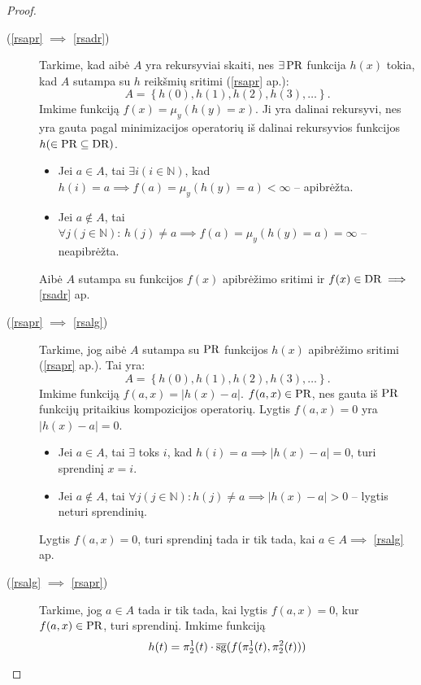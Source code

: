 \begin{prop}
\begin{proof}
    \begin{description}
      \item[(\ref{rsapr} $\implies$ \ref{rsadr})]
        Tarkime, kad aibė $A$ yra rekursyviai skaiti, nes $\exists \mathop{\text{PR}}$
        funkcija $h(x)$ tokia, kad $A$ sutampa su $h$ reikšmių 
        sritimi (\ref{rsapr} ap.):
        \[
        A = \left\{ h(0), h(1), h(2), h(3), \dotsc \right\}.
        \]
        Imkime funkciją $f(x) = \mu_{y}(h(y) = x)$. Ji yra dalinai 
        rekursyvi, nes yra gauta pagal minimizacijos operatorių iš
        dalinai rekursyvios funkcijos $h (\in \mathop{\text{PR}} \subseteq \mathop{\text{DR}})$.
        \begin{itemize}
          \item Jei $a \in A$, tai $\exists i(i \in \mathbb{N})$, kad
            $h(i) = a \implies f(a) = \mu_{y}(h(y) = a) < \infty$ 
            – apibrėžta.
          \item Jei $a \not \in A$, tai 
            $\forall j (j \in \mathbb{N}): \, h(j) \neq a \implies%
            f(a) = \mu_{y}(h(y) = a) = \infty$ – neapibrėžta.
        \end{itemize}
        Aibė $A$ sutampa su funkcijos $f(x)$ apibrėžimo sritimi ir
        $f(x) \in \mathop{\text{DR}} \implies$ \ref{rsadr} ap.
      \item[(\ref{rsapr} $\implies$ \ref{rsalg})] 
        Tarkime, jog aibė $A$ sutampa su $\mathop{\text{PR}}$ funkcijos
        $h(x)$ apibrėžimo sritimi (\ref{rsapr} ap.). Tai yra:
        \[
        A = \left\{ h(0),h(1),h(2),h(3),\dotsc \right\}.
        \]
        Imkime funkciją $f(a,x) = |h(x)-a|$. $f(a, x) \in \mathop{\text{PR}}$, nes gauta
        iš $\mathop{\text{PR}}$ funkcijų pritaikius kompozicijos operatorių. Lygtis
        $f(a,x) = 0$ yra $|h(x) - a| = 0$.
        \begin{itemize}
          \item Jei $a \in A$, tai $\exists$ toks $i$, kad 
            $h(i)=a \implies |h(x) - a| = 0$, turi sprendinį $x = i$.
          \item Jei $a \not \in A$, tai 
            $\forall j (j \in \mathbb{N}): h(j) \neq a \implies %
            |h(x) - a| > 0$ – lygtis neturi sprendinių.
        \end{itemize}
        Lygtis $f(a,x)=0$, turi sprendinį tada ir tik tada, 
        kai $a \in A \implies$ \ref{rsalg} ap.
      \item[(\ref{rsalg} $\implies$ \ref{rsapr})]
        Tarkime, jog $a \in A$ tada ir tik tada, kai lygtis 
        $f(a,x) = 0$, kur $f(a,x) \in \mathop{\text{PR}}$, turi sprendinį.
        Imkime funkciją
        \[
        h(t)=\pi^{1}_{2}(t) \cdot \sgi(f(\pi^{1}_{2}(t),\pi^{2}_{2}(t)))%
\]
\end{description}
\end{proof}
\end{prop}
